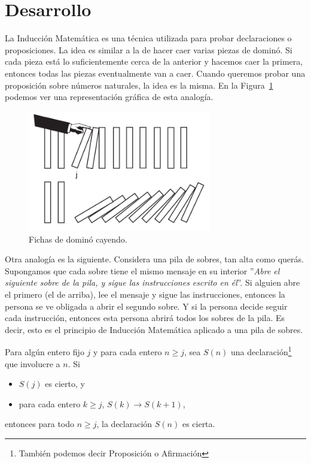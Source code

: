 \section{Desarrollo}

La Inducción Matemática es una técnica utilizada para probar declaraciones o proposiciones.
La idea es similar a la de hacer caer varias piezas de dominó.
Si cada pieza está lo suficientemente cerca de la anterior y hacemos caer la primera, entonces todas las piezas eventualmente van a caer.
Cuando queremos probar una proposición sobre números naturales, la idea es la misma.
En la Figura~\ref{fig:figure} podemos ver una representación gráfica de esta analogía.

\begin{figure}[htb]
    \centering
    \includegraphics[width=8cm]{images/dominoes-fall}
    \caption{Fichas de dominó cayendo.}
    \label{fig:figure}
\end{figure}

Otra analogía es la siguiente.
Considera una pila de sobres, tan alta como querás.
Supongamos que cada sobre tiene el mismo mensaje en su interior ''\textit{Abre el siguiente sobre de la pila, y sigue las instrucciones escrito en él}''.
Si alguien abre el primero (el de arriba), lee el mensaje y sigue las instrucciones, entonces la persona se ve obligada a abrir el segundo sobre.
Y si la persona decide seguir cada instrucción, entonces esta persona abrirá todos los sobres de la pila.
Es decir, esto es el principio de Inducción Matemática aplicado a una pila de sobres.

\begin{theorem}
    Para algún entero fijo $j$ y para cada entero $n \geq j$, sea $S(n)$ una declaración\footnote{También podemos decir Proposición o Afirmación} que involucre a $n$. Si
    \begin{itemize}
        \item $S(j)$ es cierto, y
        \item para cada entero $k \geq j$, $S(k) \rightarrow S(k + 1)$,
    \end{itemize}
    entonces para todo $n \geq j$, la declaración $S(n)$ es cierta.
\end{theorem}

